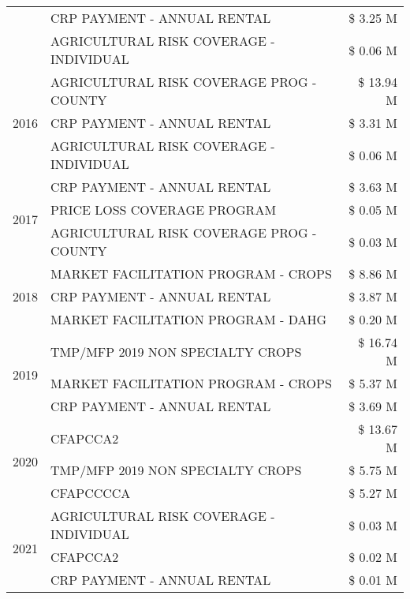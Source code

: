 \begin{tabular}{llr}
 & CRP PAYMENT - ANNUAL RENTAL & \$ 3.25 M \\
 & AGRICULTURAL RISK COVERAGE - INDIVIDUAL & \$ 0.06 M \\
\cline{1-3}
\multirow[t]{3}{*}{2016} & AGRICULTURAL RISK COVERAGE PROG - COUNTY & \$ 13.94 M \\
 & CRP PAYMENT - ANNUAL RENTAL & \$ 3.31 M \\
 & AGRICULTURAL RISK COVERAGE - INDIVIDUAL & \$ 0.06 M \\
\cline{1-3}
\multirow[t]{3}{*}{2017} & CRP PAYMENT - ANNUAL RENTAL & \$ 3.63 M \\
 & PRICE LOSS COVERAGE PROGRAM & \$ 0.05 M \\
 & AGRICULTURAL RISK COVERAGE PROG - COUNTY & \$ 0.03 M \\
\cline{1-3}
\multirow[t]{3}{*}{2018} & MARKET FACILITATION PROGRAM - CROPS & \$ 8.86 M \\
 & CRP PAYMENT - ANNUAL RENTAL & \$ 3.87 M \\
 & MARKET FACILITATION PROGRAM - DAHG & \$ 0.20 M \\
\cline{1-3}
\multirow[t]{3}{*}{2019} & TMP/MFP 2019 NON SPECIALTY CROPS & \$ 16.74 M \\
 & MARKET FACILITATION PROGRAM - CROPS & \$ 5.37 M \\
 & CRP PAYMENT - ANNUAL RENTAL & \$ 3.69 M \\
\cline{1-3}
\multirow[t]{3}{*}{2020} & CFAPCCA2 & \$ 13.67 M \\
 & TMP/MFP 2019 NON SPECIALTY CROPS & \$ 5.75 M \\
 & CFAPCCCCA & \$ 5.27 M \\
\cline{1-3}
\multirow[t]{3}{*}{2021} & AGRICULTURAL RISK COVERAGE - INDIVIDUAL & \$ 0.03 M \\
 & CFAPCCA2 & \$ 0.02 M \\
 & CRP PAYMENT - ANNUAL RENTAL & \$ 0.01 M \\
\cline{1-3}
\bottomrule
\end{tabular}
